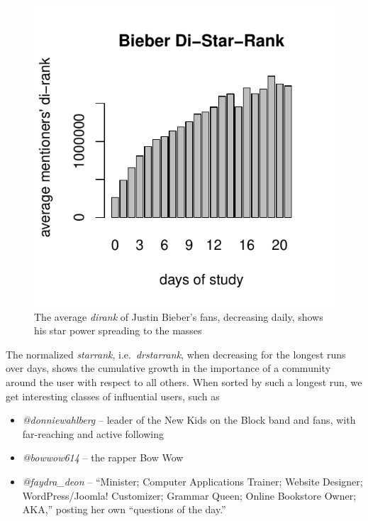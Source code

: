 \documentclass[10pt,oneside]{memoir}
\begin{document}
\begin{figure}
\begin{center}
    \includegraphics{figures/bieber-distarrank}
    \caption{The average \emph{dirank} of Justin Bieber's fans, decreasing daily, shows his star power spreading to the masses}
    \label{figure:bieber-distarrank}
\end{center}
\end{figure}
The normalized {\itshape starrank}, i.e.\ {\itshape drstarrank}, when decreasing for the longest runs over days, shows the cumulative growth in the importance of a community around the user with respect to all others.  When sorted by such a longest run, we get interesting classes of influential users, such as


\begin{itemize}


\item {\itshape @donniewahlberg} -- leader of the New Kids on the Block band and fans, with far-reaching and active following

\item {\itshape @bowwow614} -- the rapper Bow Wow

\item \emph{@faydra\_deon} -- ``Minister; Computer Applications Trainer; Website Designer; WordPress/Joomla! Customizer; Grammar Queen; Online Bookstore Owner; AKA,'' posting her own ``questions of the day.''
\end{itemize}
\end{document}

